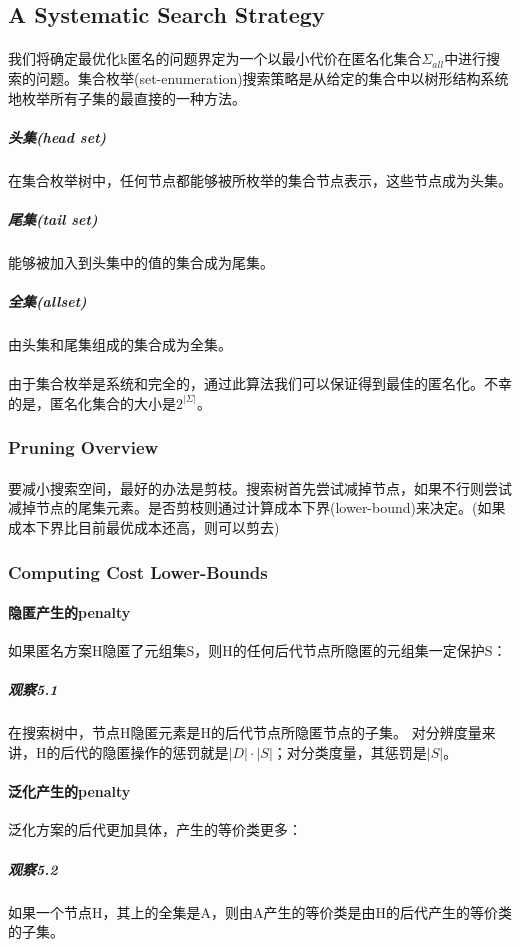 \documentclass[12pt,a4paper]{article}
\begin{document}
\subsection{A Systematic Search Strategy}
\paragraph{} 我们将确定最优化k匿名的问题界定为一个以最小代价在匿名化集合$\Sigma_{all}$中进行搜索的问题。集合枚举(set-enumeration)搜索策略是从给定的集合中以树形结构系统地枚举所有子集的最直接的一种方法。
	\subparagraph{头集(head set)} 在集合枚举树中，任何节点都能够被所枚举的集合节点表示，这些节点成为头集。
	\subparagraph{尾集(tail set)} 能够被加入到头集中的值的集合成为尾集。
	\subparagraph{全集(allset)} 由头集和尾集组成的集合成为全集。
\paragraph{} 由于集合枚举是系统和完全的，通过此算法我们可以保证得到最佳的匿名化。不幸的是，匿名化集合的大小是$2^{|\Sigma|}$。

\subsubsection{Pruning Overview}
\paragraph{} 要减小搜索空间，最好的办法是剪枝。搜索树首先尝试减掉节点，如果不行则尝试减掉节点的尾集元素。是否剪枝则通过计算成本下界(lower-bound)来决定。(如果成本下界比目前最优成本还高，则可以剪去)
\subsubsection{Computing Cost Lower-Bounds}
\paragraph{隐匿产生的penalty} 如果匿名方案H隐匿了元组集S，则H的任何后代节点所隐匿的元组集一定保护S：
	\subparagraph{观察5.1} 在搜索树中，节点H隐匿元素是H的后代节点所隐匿节点的子集。
对分辨度量来讲，H的后代的隐匿操作的惩罚就是$|D| \cdot |S|$；对分类度量，其惩罚是$|S|$。

\paragraph{泛化产生的penalty} 泛化方案的后代更加具体，产生的等价类更多：
	\subparagraph{观察5.2} 如果一个节点H，其上的全集是A，则由A产生的等价类是由H的后代产生的等价类的子集。
\end{document}
